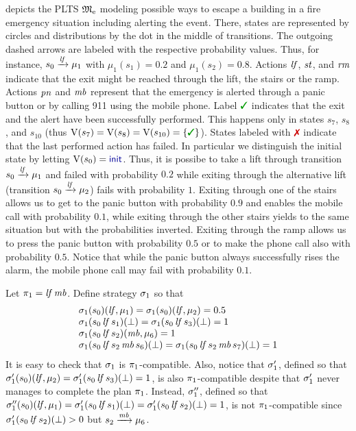 \begin{example}[Running]\label{ex:running}
   depicts the PLTS $\mathfrak{M}_{\mathrm{e}}$ modeling
  possible ways to escape a building in a fire emergency situation
  including alerting the event.  There, states are represented by
  circles and distributions by the dot in the middle of transitions.
  The outgoing dashed arrows are labeled with the respective
  probability values.  Thus, for instance, $s_0\xrightarrow{\mathit{lf}}\mu_1$
  with $\mu_1(s_1)=0.2$ and $\mu_1(s_2)=0.8$.
  Actions $\mathit{lf}$, $\mathit{st}$, and $\mathit{rm}$ indicate that the exit might
  be reached through the lift, the stairs or the ramp.  Actions
  $\mathit{pn}$ and $\mathit{mb}$ represent that the emergency is alerted
  through a panic button or by calling 911 using the mobile phone.
  Label $\goal$ indicates that the exit and the alert have been
  successfully performed.  This happens only in states $s_7$, $s_8$,
  and $s_{10}$ (thus $\V(s_7)=\V(s_8)=\V(s_{10})=\{\goal\}$).  States
  labeled with $\fail$ indicate that the last performed action has
  failed.  In particular we distinguish the initial state by letting
  $\V(s_0)=\init$.
  Thus, it is possibe to take a lift through transition
  $s_0\xrightarrow{\mathit{lf}}\mu_1$ and failed with probability $0.2$ while
  exiting through the alternative lift (transition
  $s_0\xrightarrow{\mathit{lf}}\mu_2$) fails with probability $1$.
  Exiting through one of the stairs allows us to get to the panic
  button with probability $0.9$ and enables the mobile call with
  probability $0.1$, while exiting through the other stairs yields to
  the same situation but with the probabilities inverted.  Exiting
  through the ramp allows us to press the panic button with
  probability $0.5$ or to make the phone call also with probability
  $0.5$.
  Notice that while the panic button always successfully rises the
  alarm, the mobile phone call may fail with probability $0.1$.

  Let $\pi_1 = \mathit{lf}\,\mathit{mb}$.  Define strategy $\sigma_1$ so that
  \[
  \begin{array}{l}
    \sigma_1(s_0)(\mathit{lf},\mu_1)=\sigma_1(s_0)(\mathit{lf},\mu_2)=0.5\\
    \sigma_1(s_0\,\mathit{lf}\,s_1)(\bot)=\sigma_1(s_0\,\mathit{lf}\,s_3)(\bot)=1\\
    \sigma_1(s_0\,\mathit{lf}\,s_2)(\mathit{mb},\mu_6)=1\\
    \sigma_1(s_0\,\mathit{lf}\,s_2\,\mathit{mb}\,s_6)(\bot)=
    \sigma_1(s_0\,\mathit{lf}\,s_2\,\mathit{mb}\,s_7)(\bot)=1
  \end{array}
  \]
  It is easy to check that $\sigma_1$ is $\pi_1$-compatible.
  Also, notice that $\sigma'_1$, defined so that
  $\sigma'_1(s_0)(\mathit{lf},\mu_2)=\sigma'_1(s_0\,\mathit{lf}\,s_3)(\bot)=1$,
  is also $\pi_1$-compatible despite that $\sigma'_1$ never manages to
  complete the plan $\pi_1$.
  Instead, $\sigma''_1$, defined so that
  $\sigma''_1(s_0)(\mathit{lf},\mu_1)=\sigma'_1(s_0\,\mathit{lf}\,s_1)(\bot)=\sigma'_1(s_0\,\mathit{lf}\,s_2)(\bot)=1$,
  is not $\pi_1$-compatible since
  $\sigma'_1(s_0\,\mathit{lf}\,s_2)(\bot)>0$ but
  ${s_2\xrightarrow{\mathit{mb}}\mu_6}$.
\end{example}


